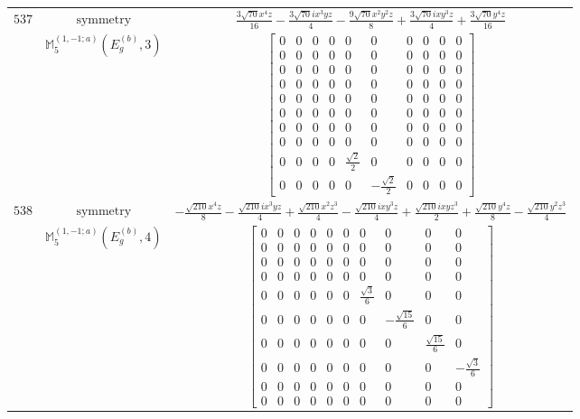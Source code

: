 \documentclass[fleqn,8pt,landscape]{jsarticle}
\begin{document}
\begin{longtable}{ccc}
$ 537 $ & $ \text{symmetry} $ & $ \frac{3 \sqrt{70} x^{4} z}{16} - \frac{3 \sqrt{70} i x^{3} y z}{4} - \frac{9 \sqrt{70} x^{2} y^{2} z}{8} + \frac{3 \sqrt{70} i x y^{3} z}{4} + \frac{3 \sqrt{70} y^{4} z}{16} $ \\
$  $ & $ \mathbb{M}_{5}^{(1,-1;a)}(E_{g}^{(b)},3) $ & $ \begin{bmatrix} 0 & 0 & 0 & 0 & 0 & 0 & 0 & 0 & 0 & 0 \\ 0 & 0 & 0 & 0 & 0 & 0 & 0 & 0 & 0 & 0 \\ 0 & 0 & 0 & 0 & 0 & 0 & 0 & 0 & 0 & 0 \\ 0 & 0 & 0 & 0 & 0 & 0 & 0 & 0 & 0 & 0 \\ 0 & 0 & 0 & 0 & 0 & 0 & 0 & 0 & 0 & 0 \\ 0 & 0 & 0 & 0 & 0 & 0 & 0 & 0 & 0 & 0 \\ 0 & 0 & 0 & 0 & 0 & 0 & 0 & 0 & 0 & 0 \\ 0 & 0 & 0 & 0 & 0 & 0 & 0 & 0 & 0 & 0 \\ 0 & 0 & 0 & 0 & \frac{\sqrt{2}}{2} & 0 & 0 & 0 & 0 & 0 \\ 0 & 0 & 0 & 0 & 0 & - \frac{\sqrt{2}}{2} & 0 & 0 & 0 & 0 \end{bmatrix} $ \\ \hline
$ 538 $ & $ \text{symmetry} $ & $ - \frac{\sqrt{210} x^{4} z}{8} - \frac{\sqrt{210} i x^{3} y z}{4} + \frac{\sqrt{210} x^{2} z^{3}}{4} - \frac{\sqrt{210} i x y^{3} z}{4} + \frac{\sqrt{210} i x y z^{3}}{2} + \frac{\sqrt{210} y^{4} z}{8} - \frac{\sqrt{210} y^{2} z^{3}}{4} $ \\
$  $ & $ \mathbb{M}_{5}^{(1,-1;a)}(E_{g}^{(b)},4) $ & $ \begin{bmatrix} 0 & 0 & 0 & 0 & 0 & 0 & 0 & 0 & 0 & 0 \\ 0 & 0 & 0 & 0 & 0 & 0 & 0 & 0 & 0 & 0 \\ 0 & 0 & 0 & 0 & 0 & 0 & 0 & 0 & 0 & 0 \\ 0 & 0 & 0 & 0 & 0 & 0 & 0 & 0 & 0 & 0 \\ 0 & 0 & 0 & 0 & 0 & 0 & \frac{\sqrt{3}}{6} & 0 & 0 & 0 \\ 0 & 0 & 0 & 0 & 0 & 0 & 0 & - \frac{\sqrt{15}}{6} & 0 & 0 \\ 0 & 0 & 0 & 0 & 0 & 0 & 0 & 0 & \frac{\sqrt{15}}{6} & 0 \\ 0 & 0 & 0 & 0 & 0 & 0 & 0 & 0 & 0 & - \frac{\sqrt{3}}{6} \\ 0 & 0 & 0 & 0 & 0 & 0 & 0 & 0 & 0 & 0 \\ 0 & 0 & 0 & 0 & 0 & 0 & 0 & 0 & 0 & 0 \end{bmatrix} $ \\ \hline

\end{longtable}
\end{document}
